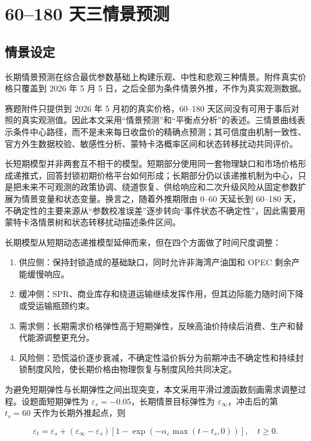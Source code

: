 \section{60--180 天三情景预测}

\subsection{情景设定}

长期情景预测在综合最优参数基础上构建乐观、中性和悲观三种情景。附件真实价格只覆盖到 2026 年 5 月 5 日，之后全部为条件情景外推，不作为真实观测数据。

赛题附件只提供到 2026 年 5 月初的真实价格，60--180 天区间没有可用于事后对照的真实观测值。因此本文采用“情景预测”和“平衡点分析”的表述。三情景曲线表示条件中心路径，而不是未来每日收盘价的精确点预测；其可信度由机制一致性、官方外生数据校验、敏感性分析、蒙特卡洛概率区间和状态转移扰动共同评价。

长短期模型并非两套互不相干的模型。短期部分使用同一套物理缺口和市场价格形成递推式，回答封锁初期价格平台如何形成；长期部分仍以该递推机制为中心，只是把未来不可观测的政策协调、绕道恢复、供给响应和二次升级风险从固定参数扩展为情景变量和状态变量。换言之，随着外推期限由 0--60 天延长到 60--180 天，不确定性的主要来源从“参数校准误差”逐步转向“事件状态不确定性”，因此需要用蒙特卡洛情景树和状态转移扰动描述条件区间。

长期模型从短期动态递推模型延伸而来，但在四个方面做了时间尺度调整：

\begin{enumerate}
  \item 供应侧：保持封锁造成的基础缺口，同时允许非海湾产油国和 OPEC 剩余产能缓慢响应。
  \item 缓冲侧：SPR、商业库存和绕道运输继续发挥作用，但其边际能力随时间下降或受运输瓶颈约束。
  \item 需求侧：长期需求价格弹性高于短期弹性，反映高油价持续后消费、生产和替代能源调整更充分。
  \item 风险侧：恐慌溢价逐步衰减，不确定性溢价拆分为前期冲击不确定性和持续封锁制度风险，使长期价格由物理恢复与制度风险共同决定。
\end{enumerate}

为避免短期弹性与长期弹性之间出现突变，本文采用平滑过渡函数刻画需求调整过程。设题面短期弹性为 \(\varepsilon_s=-0.05\)，长期情景目标弹性为 \(\varepsilon_\infty\)，冲击后的第 \(t_s=60\) 天作为长期外推起点，则

\begin{equation}
\varepsilon_t
=
\varepsilon_s
+
\left(\varepsilon_\infty-\varepsilon_s\right)
\left[1-\exp\left(-\alpha_\varepsilon\max(t-t_s,0)\right)\right],
\quad t\ge 0 .
\end{equation}

